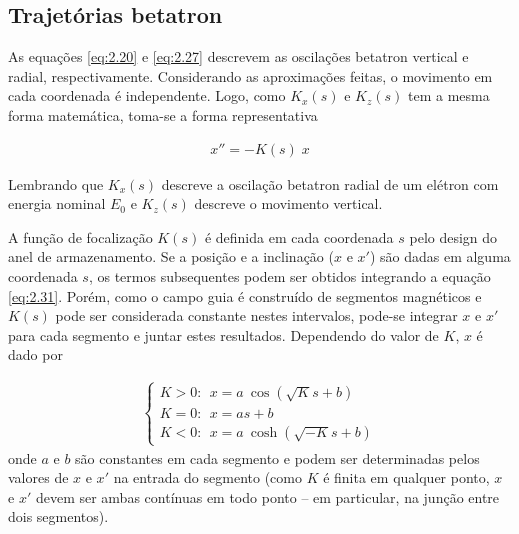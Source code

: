 \subsection{Trajetórias betatron}\label{sec:2.5}
As equações \eqref{eq:2.20} e \eqref{eq:2.27} descrevem as oscilações betatron vertical e radial, respectivamente. Considerando as aproximações feitas, o movimento em cada coordenada é independente. Logo, como $K_x(s)$ e $K_z(s)$ tem a mesma forma matemática, toma-se a forma representativa
	
\begin{align}
	x'' = -K(s) \; x \label{eq:2.31}
\end{align}
	
Lembrando que $K_x(s)$ descreve a oscilação betatron radial de um elétron com energia nominal $E_0$ e $K_z(s)$ descreve o movimento vertical.
	
A função de focalização $K(s)$ é definida em cada coordenada $s$ pelo design do anel de armazenamento. Se a posição e a inclinação ($x$ e $x'$) são dadas em alguma coordenada $s$, os termos subsequentes podem ser obtidos integrando a equação \eqref{eq:2.31}. Porém, como o campo guia é construído de segmentos magnéticos e $K(s)$ pode ser considerada constante nestes intervalos, pode-se integrar $x$ e $x'$ para cada segmento e juntar estes resultados. Dependendo do valor de $K$, $x$ é dado por

\begin{align}
	\left\{\begin{array}{l}
	K>0: \ \ x = a\ \cos(\sqrt{K}s+b) \\
	K=0: \ \ x = as+b \\
	K<0: \ \ x = a\ \cosh(\sqrt{-K}s+b)
	\end{array}\right. \label{eq:2.32}
\end{align}
onde $a$ e $b$ são constantes em cada segmento e podem ser determinadas pelos valores de $x$ e $x'$ na entrada do segmento (como $K$ é finita em qualquer ponto, $x$ e $x'$ devem ser ambas contínuas em todo ponto -- em particular, na junção entre dois segmentos).
	
